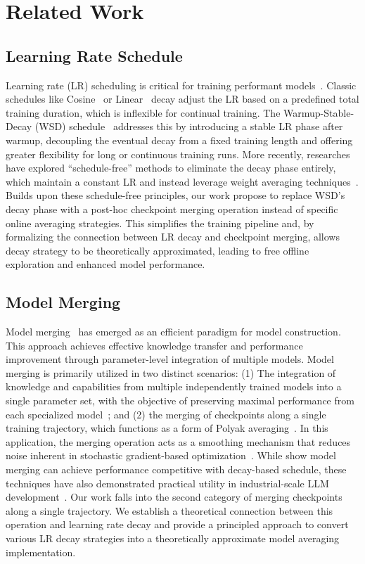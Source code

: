 
\section{Related Work}

\subsection{Learning Rate Schedule}
Learning rate (LR) scheduling is critical for training performant models~\citep{Rethinking,Akhilesh}. Classic schedules like Cosine~\citep{kaplan2020scaling,Simple} or Linear~\citep{defazio2023optimal} decay adjust the LR based on a predefined total training duration, which is inflexible for continual training. The Warmup-Stable-Decay (WSD) schedule~\citep{minicpm} addresses this by introducing a stable LR phase after warmup, decoupling the eventual decay from a fixed training length and offering greater flexibility for long or continuous training runs. More recently, researches have explored ``schedule-free'' methods to eliminate the decay phase entirely, which maintain a constant LR and instead leverage weight averaging techniques~\citep{Aaron2024Road,song2025through,Hanlin2025cbs}. Builds upon these schedule-free principles, our work propose to replace WSD's decay phase with a post-hoc checkpoint merging operation instead of specific online averaging strategies. This simplifies the training pipeline and, by formalizing the connection between LR decay and checkpoint merging, allows decay strategy to be theoretically approximated, leading to free offline exploration and enhanced model performance.

\subsection{Model Merging}
Model merging~\citep{Averaging,Modelsoups} has emerged as an efficient paradigm for model construction. This approach achieves effective knowledge transfer and performance improvement through parameter-level integration of multiple models.
Model merging is primarily utilized in two distinct scenarios: (1) The integration of knowledge and capabilities from multiple independently trained models into a single parameter set, with the objective of preserving maximal performance from each specialized model~\citep{commanda,WARP};  and (2) the merging of checkpoints along a single training trajectory, which functions as a form of Polyak averaging~\citep{polyak1992acceleration}. In this application, the merging operation acts as a smoothing mechanism that reduces noise inherent in stochastic gradient-based optimization~\citep{sanyal2023early,Checkpoint,lawa,Trainable,Sandler2023training,1sqrt}. While \cite{pma} show model merging can achieve
performance competitive with decay-based schedule, these techniques have also demonstrated practical utility in industrial-scale LLM development~\citep{grattafiori2024llama,deepseekv3,commanda}.
Our work falls into the second category of merging checkpoints along a single trajectory. We establish a theoretical connection between this operation and learning rate decay and provide a principled approach to convert various
LR decay strategies into a theoretically approximate model averaging implementation. 
